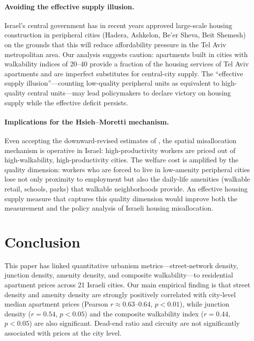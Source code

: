 \documentclass[12pt,a4paper]{article}
\begin{document}
\paragraph{Avoiding the effective supply illusion.}  Israel's central government
has in recent years approved large-scale housing construction in peripheral
cities (Hadera, Ashkelon, Be'er Sheva, Beit Shemesh) on the grounds that this
will reduce affordability pressure in the Tel Aviv metropolitan area.
Our analysis suggests caution: apartments built in cities with walkability
indices of 20--40 provide a fraction of the housing services of Tel Aviv
apartments and are imperfect substitutes for central-city supply.  The
``effective supply illusion''—counting low-quality peripheral units as
equivalent to high-quality central units—may lead policymakers to declare
victory on housing supply while the effective deficit persists.

\paragraph{Implications for the Hsieh--Moretti mechanism.}  Even accepting the
downward-revised estimates of \citet{greaney2023}, the spatial misallocation
mechanism is operative in Israel: high-productivity workers are priced out of
high-walkability, high-productivity cities.  The welfare cost is amplified by
the quality dimension: workers who are forced to live in low-amenity peripheral
cities lose not only proximity to employment but also the daily-life amenities
(walkable retail, schools, parks) that walkable neighborhoods provide.  An
effective housing supply measure that captures this quality dimension would
improve both the measurement and the policy analysis of Israeli housing
misallocation.

\section{Conclusion}
\label{sec:conclusion}

This paper has linked quantitative urbanism metrics—street-network density,
junction density, amenity density, and composite walkability—to residential
apartment prices across 21 Israeli cities.  Our main empirical finding is that
street density and amenity density are strongly positively correlated with
city-level median apartment prices (Pearson $r \approx 0.63$--$0.64$,
$p<0.01$), while junction density ($r=0.54$, $p<0.05$) and the composite
walkability index ($r=0.44$, $p<0.05$) are also significant.  Dead-end ratio
and circuity are not significantly associated with prices at the city level.
\end{document}
